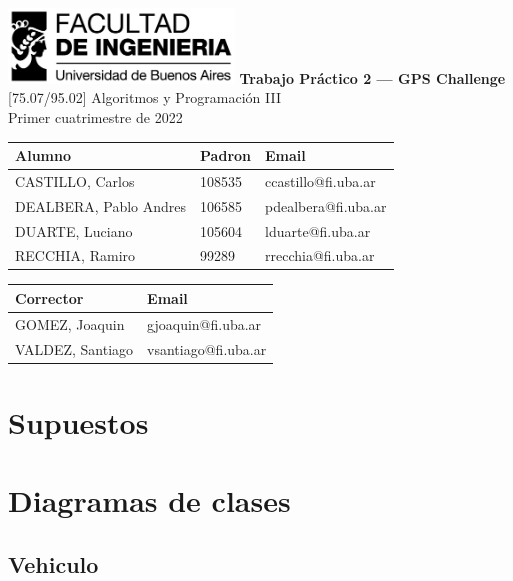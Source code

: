 \documentclass[titlepage,a4paper]{article}
\date{\today}
\title{}
\begin{document}
\begin{titlepage}
    \hfill\includegraphics[width=6cm]{assets/logofiuba.jpg}
    \centering
    \vfill
    \Huge \textbf{Trabajo Práctico 2 — GPS Challenge}
    \vskip2cm
    \Large [75.07/95.02] Algoritmos y Programación III \\
    Primer cuatrimestre de 2022\\
    \vfill
    \begin{tabular}{ | l | l | l | }
      \hline
      Alumno & Padron & Email \\ \hline
      CASTILLO, Carlos & 108535 & ccastillo@fi.uba.ar \\ \hline
      DEALBERA, Pablo Andres & 106585 & pdealbera@fi.uba.ar \\ \hline
      DUARTE, Luciano & 105604 & lduarte@fi.uba.ar \\ \hline
      RECCHIA, Ramiro & 99289 & rrecchia@fi.uba.ar \\ \hline
    \end{tabular}
    \vfill
    \begin{tabular}{ | l | l | }
      \hline
      Corrector & Email \\ \hline
      GOMEZ, Joaquin & gjoaquin@fi.uba.ar \\ \hline
      VALDEZ, Santiago & vsantiago@fi.uba.ar \\ \hline
    \end{tabular}
    \vfill
\end{titlepage}
\tableofcontents
\newpage
{}

\section{Supuestos}
\label{sec:org47d20ed}

\section{Diagramas de clases}
\label{sec:org1f4f733}
\subsection{Vehiculo}
\label{sec:org7c37a4f}
\end{document}
